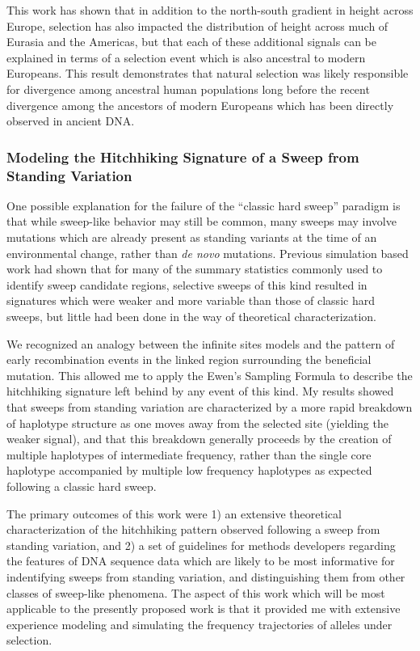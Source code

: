 \documentclass[11pt]{article}
\begin{document}
This work has shown that in addition to the north-south gradient in height across Europe, selection has also impacted the distribution of height across much of Eurasia and the Americas, but that each of these additional signals can be explained in terms of a selection event which is also ancestral to modern Europeans. This result demonstrates that natural selection was likely responsible for divergence among ancestral human populations long before the recent divergence among the ancestors of modern Europeans which has been directly observed in ancient DNA.


\subsubsection*{Modeling the Hitchhiking Signature of a Sweep from Standing Variation}

One possible explanation for the failure of the ``classic hard sweep'' paradigm is that while sweep-like behavior may still be common, many sweeps may involve mutations which are already present as standing variants at the time of an environmental change, rather than \textit{de novo} mutations. Previous simulation based work had shown that for many of the summary statistics commonly used to identify sweep candidate regions, selective sweeps of this kind resulted in signatures which were weaker and more variable than those of classic hard sweeps, but little had been done in the way of theoretical characterization.

We recognized an analogy between the infinite sites models and the pattern of early recombination events in the linked region surrounding the beneficial mutation. This allowed me to apply the Ewen's Sampling Formula to describe the hitchhiking signature left behind by any event of this kind. My results showed that sweeps from standing variation are characterized by a more rapid breakdown of haplotype structure as one moves away from the selected site (yielding the weaker signal), and that this breakdown generally proceeds by the creation of multiple haplotypes of intermediate frequency, rather than the single core haplotype accompanied by multiple low frequency haplotypes as expected following a classic hard sweep.

The primary outcomes of this work were 1) an extensive theoretical characterization of the hitchhiking pattern observed following a sweep from standing variation, and 2) a set of guidelines for methods developers regarding the features of DNA sequence data which are likely to be most informative for indentifying sweeps from standing variation, and distinguishing them from other classes of sweep-like phenomena. The aspect of this work which will be most applicable to the presently proposed work is that it provided me with extensive experience modeling and simulating the frequency trajectories of alleles under selection.
\end{document}
